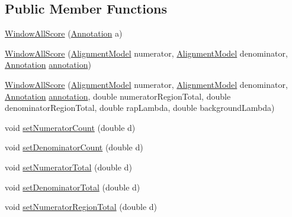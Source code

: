 \subsection*{Public Member Functions}
\begin{DoxyCompactItemize}
\item 
\hyperlink{classumms_1_1core_1_1model_1_1score_1_1_window_all_score_af1b8333e0a1364e16b6b4983aad4ce77}{Window\+All\+Score} (\hyperlink{interfaceumms_1_1core_1_1annotation_1_1_annotation}{Annotation} a)
\item 
\hyperlink{classumms_1_1core_1_1model_1_1score_1_1_window_all_score_aa20eebc9daa9c6ac43be442f2886716e}{Window\+All\+Score} (\hyperlink{classumms_1_1core_1_1model_1_1_alignment_model}{Alignment\+Model} numerator, \hyperlink{classumms_1_1core_1_1model_1_1_alignment_model}{Alignment\+Model} denominator, \hyperlink{interfaceumms_1_1core_1_1annotation_1_1_annotation}{Annotation} \hyperlink{classumms_1_1core_1_1model_1_1score_1_1_window_score_1_1_abstract_window_score_a455fb02f18f492e611113b9da0a24888}{annotation})
\item 
\hyperlink{classumms_1_1core_1_1model_1_1score_1_1_window_all_score_a2c189eb39c242a3e29b51f48d2f2c4b7}{Window\+All\+Score} (\hyperlink{classumms_1_1core_1_1model_1_1_alignment_model}{Alignment\+Model} numerator, \hyperlink{classumms_1_1core_1_1model_1_1_alignment_model}{Alignment\+Model} denominator, \hyperlink{interfaceumms_1_1core_1_1annotation_1_1_annotation}{Annotation} \hyperlink{classumms_1_1core_1_1model_1_1score_1_1_window_score_1_1_abstract_window_score_a455fb02f18f492e611113b9da0a24888}{annotation}, double numerator\+Region\+Total, double denominator\+Region\+Total, double rap\+Lambda, double background\+Lambda)
\item 
void \hyperlink{classumms_1_1core_1_1model_1_1score_1_1_window_all_score_acf6d535853a190576a240e96c23df034}{set\+Numerator\+Count} (double d)
\item 
void \hyperlink{classumms_1_1core_1_1model_1_1score_1_1_window_all_score_a3f247967161862211e93a4726bb565e5}{set\+Denominator\+Count} (double d)
\item 
void \hyperlink{classumms_1_1core_1_1model_1_1score_1_1_window_all_score_aea5c0751bb3ca3195c75e364faf30970}{set\+Numerator\+Total} (double d)
\item 
void \hyperlink{classumms_1_1core_1_1model_1_1score_1_1_window_all_score_a3d0f374e39af3b1f1f73b0aeaac32526}{set\+Denominator\+Total} (double d)
\item 
void \hyperlink{classumms_1_1core_1_1model_1_1score_1_1_window_all_score_a4a64cec6c0ca531671a409d7c47cea15}{set\+Numerator\+Region\+Total} (double d)

\end{DoxyCompactItemize}
